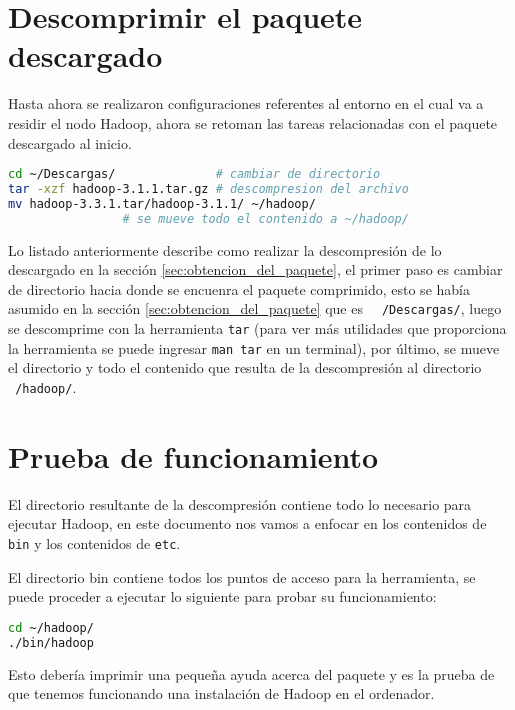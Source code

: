 \section{Descomprimir el paquete descargado}
\label{sec:descomprimir_el_paquete_descargado}

Hasta ahora se realizaron configuraciones referentes al entorno en el cual va a
residir el nodo Hadoop, ahora se retoman las tareas relacionadas con el paquete 
descargado al inicio.

\begin{lstlisting}[language=bash, caption=Descompresión del paquete Hadoop, 
label=lst:descompresion_hadoop]
cd ~/Descargas/              # cambiar de directorio 
tar -xzf hadoop-3.1.1.tar.gz # descompresion del archivo
mv hadoop-3.3.1.tar/hadoop-3.1.1/ ~/hadoop/ 
                # se mueve todo el contenido a ~/hadoop/ 
\end{lstlisting}

Lo listado anteriormente describe como realizar la descompresión de lo
descargado en la sección \ref{sec:obtencion_del_paquete}, el primer paso es
cambiar de directorio hacia donde se encuenra el paquete comprimido, esto se
había asumido en la sección \ref{sec:obtencion_del_paquete} que es {\tt
~/Descargas/}, luego se descomprime con la herramienta {\tt tar} (para ver más
utilidades que proporciona la herramienta se puede ingresar {\tt man tar} en un
terminal), por último, se mueve el directorio y todo el contenido que resulta de
la descompresión al directorio {\tt ~/hadoop/}.

\section{Prueba de funcionamiento}
\label{sec:prueba_de_funcionamiento}

El directorio resultante de la descompresión contiene todo lo necesario para
ejecutar Hadoop, en este documento nos vamos a enfocar en los contenidos de
{\tt bin} y los contenidos de {\tt etc}. 

El directorio {bin} contiene todos los puntos de acceso para la herramienta, se
puede proceder a ejecutar lo siguiente para probar su funcionamiento:

\begin{lstlisting}[language=bash, caption=Prueba de funcionamiento, 
label=lst:prueba_de_funcionamiento]
cd ~/hadoop/
./bin/hadoop
\end{lstlisting}

Esto debería imprimir una pequeña ayuda acerca del paquete y es la prueba de
que tenemos funcionando una instalación de Hadoop en el ordenador.

